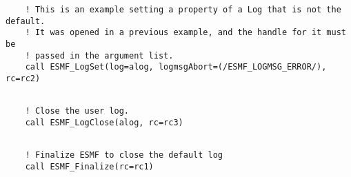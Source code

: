 
 \begin{verbatim}
    ! This is an example setting a property of a Log that is not the default.
    ! It was opened in a previous example, and the handle for it must be
    ! passed in the argument list.
    call ESMF_LogSet(log=alog, logmsgAbort=(/ESMF_LOGMSG_ERROR/), rc=rc2)
 
\end{verbatim}
 

 \begin{verbatim}
    ! Close the user log.
    call ESMF_LogClose(alog, rc=rc3)
 
\end{verbatim}
 

 \begin{verbatim}
    ! Finalize ESMF to close the default log
    call ESMF_Finalize(rc=rc1)
 
\end{verbatim}

\setlength{\parskip}{\oldparskip}
\setlength{\parindent}{\oldparindent}
\setlength{\baselineskip}{\oldbaselineskip}
